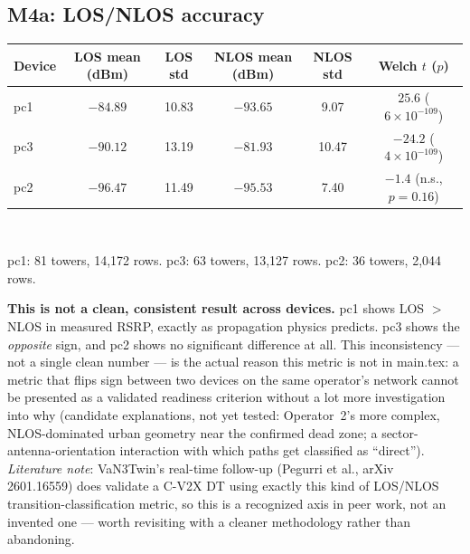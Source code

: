 \documentclass[11pt]{article}
\begin{document}
\subsection{M4a: LOS/NLOS accuracy}
\begin{table}[h]
\centering
\small
\begin{tabular}{lccccc}
\toprule
Device & LOS mean (dBm) & LOS std & NLOS mean (dBm) & NLOS std & Welch $t$ ($p$) \\
\midrule
pc1 & $-84.89$ & 10.83 & $-93.65$ & 9.07 & $25.6$ ($6\times10^{-109}$) \\
pc3 & $-90.12$ & 13.19 & $-81.93$ & 10.47 & $-24.2$ ($4\times10^{-109}$) \\
pc2 & $-96.47$ & 11.49 & $-95.53$ & 7.40 & $-1.4$ (n.s., $p=0.16$) \\
\bottomrule
\end{tabular}\\[2mm]
\raggedright\footnotesize
pc1: 81 towers, 14{,}172 rows. pc3: 63 towers, 13{,}127 rows. pc2: 36 towers, 2{,}044 rows.
\end{table}

\textbf{This is not a clean, consistent result across devices.} pc1 shows
LOS $>$ NLOS in measured RSRP, exactly as propagation physics predicts.
pc3 shows the \emph{opposite} sign, and pc2 shows no significant
difference at all. This inconsistency — not a single clean number — is
the actual reason this metric is not in main.tex: a metric that flips
sign between two devices on the same operator's network cannot be
presented as a validated readiness criterion without a lot more
investigation into why (candidate explanations, not yet tested:
Operator~2's more complex, NLOS-dominated urban geometry near the
confirmed dead zone; a sector-antenna-orientation interaction with which
paths get classified as ``direct''). \emph{Literature note}: VaN3Twin's
real-time follow-up (Pegurri et al., arXiv 2601.16559) does validate a
C-V2X DT using exactly this kind of LOS/NLOS transition-classification
metric, so this is a recognized axis in peer work, not an invented one —
worth revisiting with a cleaner methodology rather than abandoning.
\end{document}

